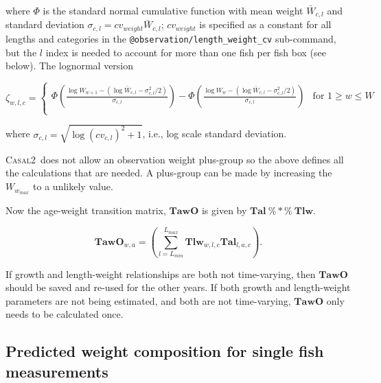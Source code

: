 \documentclass[a4paper,11pt,twoside,pdftex,draft]{article}
\newcommand{\CNAME}{\textsc{Casal2}}
\begin{document}
where $\Phi$ is the standard normal cumulative function with mean weight $\bar W_{c,l}$ and standard deviation $\sigma_{c,l}= cv_{weight} \bar W_{c,l}$; $cv_{weight}$ is specified as a constant for all lengths and categories  in the  \texttt{@observation/length\_weight\_cv} sub-command, but the $l$ index is needed to account for more than one fish per fish box (see below). The lognormal version

\begin{equation}
\zeta_{w,l,c} =
\begin{cases}

\Phi\left( \frac{\log W_{w+1} - \left( \log\bar W_{c,l}  - \sigma_{c,l}^2/2 \right)}{\sigma_{c,l}} \right)   - \Phi\left( \frac{\log W_{w} - \left( \log\bar W_{c,l}  - \sigma_{c,l}^2/2 \right)}{\sigma_{c,l}} \right) & \text{for } 1 \geq w \leq W \\

\end{cases}
\end{equation}

where $\sigma_{c,l} = \sqrt{\log(cv_{c,l})^2 + 1}$, i.e., log scale standard deviation.

\CNAME~does not allow an observation weight plus-group so the above defines all the calculations that are needed. A plus-group can be made by increasing the $W_{w_{max}}$ to a unlikely value.

Now the age-weight transition matrix, $\mathbf{TawO}$ is given by $\mathbf{Tal} \ \%*\%\ \mathbf{Tlw} $.

\begin{equation}
\mathbf{TawO}_{w,a} = \left( \sum_{l=L_{min}}^{L_{max}}  \mathbf{Tlw}_{w,l,c}  \mathbf{Tal}_{l,a,c}\right).
\end{equation}

If growth and length-weight relationships are both not time-varying, then $\mathbf{TawO}$ should be saved and re-used for the other years. If both growth and length-weight parameters are not being estimated, and both are not time-varying, $\mathbf{TawO}$ only needs to be calculated once.


\subsection{Predicted weight composition for single fish measurements}
\end{document}
